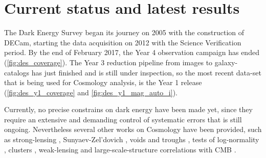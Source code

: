 \section{Current status and latest results}
The Dark Energy Survey began its journey on 2005 with the construction of DECam, starting the data acquisition on 2012 with the Science Verification period. By the end of February 2017, the Year 4 observation campaign has ended (\autoref{fig:des_coverage}). The Year 3 reduction pipeline from images to galaxy-catalogs has just finished and is still under inspection, so the most recent data-set that is being used for Cosmology analysis, is the Year 1 release (\autoref{fig:des_y1_coverage} and \autoref{fig:des_y1_mag_auto_i}).
\newline

Currently, no precise constrains on dark energy have been made yet, since they require an extensive and demanding control of systematic errors that is still ongoing. Nevertheless several other works on Cosmology have been provided, such as strong-lensing \cite{2015MNRAS.454.1260A,2016ApJ...827...51N,2017ApJ...838L..15L}, Sunyaev-Zel'dovich \cite{2016arXiv160508770S}, voids and troughs \cite{2016MNRAS.455.3367G,2017MNRAS.465..746S}, tests of log-normality \cite{2017MNRAS.466.1444C}, clusters \cite{2017MNRAS.467.4015H}, weak-lensing \cite{2015PhRvD..92b2006V,2016PhRvD..94b2002B,2016MNRAS.459...21K,2016MNRAS.461.3172S,2016MNRAS.461.4099B,2016arXiv160908167P,2017MNRAS.465.4204C} and large-scale-structure correlations with CMB \cite{2016MNRAS.456.3213G,2016MNRAS.459...21K,2017MNRAS.465.4166K}.
\newline

